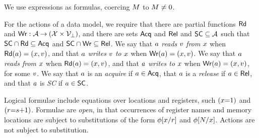 We use expressions as formulas, coercing $M$ to $M\neq 0$.

For the actions of a data model, we require that
  there are partial functions $\mathsf{Rd}$ and
  $\mathsf{Wr}: \mathcal{A} \mathbin\rightarrow (\mathcal{X} \times \mathcal{V}_\bot)$, and
  there are sets $\mathsf{Acq}$ and $\mathsf{Rel}$ and $\mathsf{SC} \subseteq\mathcal{A}$ such that
  $\mathsf{SC}\cap\mathsf{Rd}\subseteq\mathsf{Acq}$ and
  $\mathsf{SC}\cap\mathsf{Wr}\subseteq\mathsf{Rel}$. %
%
We say that $a$ \emph{reads} $v$ \emph{from} $x$ when
$\mathsf{Rd}(a) = (x,v)$, and that $a$ \emph{writes} $v$
\emph{to} $x$ when $\mathsf{Wr}(a) = (x,v)$.
We say that $a$ \emph{reads from} $x$ when
$\mathsf{Rd}(a) = (x,v)$, and that $a$ \emph{writes to}
$x$ when $\mathsf{Wr}(a) = (x,v)$, for some $v$. %
%
%
We say that $a$ is an \emph{acquire} if $a\in\mathsf{Acq}$, that $a$
is a \emph{release} if $a\in\mathsf{Rel}$, and that $a$ is \emph{SC} if $a\in\mathsf{SC}$.  



Logical formulae include equations over locations and registers, such
$(x{=}1)$ and $(r{=}s{+}1)$.  Formulae are \emph{open}, in that
occurrences of register names and memory locations are subject to
substitutions of the form $\phi[x/r]$ and $\phi[N/x]$.
Actions are not subject to substitution.


